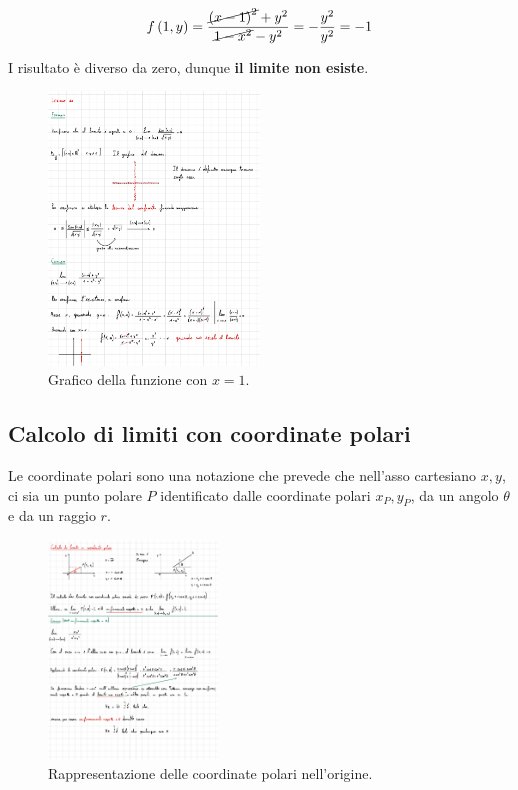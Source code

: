 \documentclass[a4paper]{article}
\begin{document}
	\begin{equation*}
		f\left(1,y\right) = \dfrac{\cancel{\left(x-1\right)^{2}} + y^{2}}{\cancel{1 - x^{2}} - y^{2}} = -\dfrac{y^{2}}{y^{2}} = -1
	\end{equation*}

	\noindent
	I risultato è diverso da zero, dunque \textbf{il limite non esiste}.
	
	\begin{figure}[!htp]
		\centering
		\includegraphics[width=0.5\textwidth]{img/limiti_ex4.pdf}
		\caption{Grafico della funzione con $x = 1$.}
	\end{figure}

	\newpage
	
	\subsection{Calcolo di limiti con coordinate polari}
	
	Le coordinate polari sono una notazione che prevede che nell'asso cartesiano $x,y$, ci sia un punto polare $P$ identificato dalle coordinate polari $x_{P},y_{P}$, da un angolo $\theta$ e da un raggio $r$.
	
	\begin{figure}[!htp]
		\centering
		\includegraphics[width=0.4\textwidth]{img/limiti_con_coordinate_polari.pdf}
		\caption{Rappresentazione delle coordinate polari nell'origine.}
	\end{figure}
\end{document}
